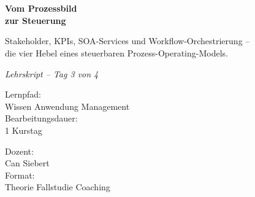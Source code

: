 \documentclass[11pt,a4paper,oneside]{article}
\newcommand{\caveatfontfallback}{\itshape}
\newcommand\caveatfont{\caveatfontfallback}%
\begin{document}
\begin{titlepage}
  \pagestyle{empty}
  \vspace*{1.5cm}
  \\[2pt]
  \noindent{\color{lpAccent}\rule{\linewidth}{1.2pt}}\\[4pt]

  \vspace{3cm}
  {\sffamily\fontsize{30}{34}\selectfont\bfseries\color{lpInk}Vom Prozessbild\\zur Steuerung\par}

  \vspace{0.7cm}
  {\sffamily\large\color{lpGray}Stakeholder, KPIs, SOA-Services und Workflow-Orchestrierung --\\die vier Hebel eines steuerbaren Prozess-Operating-Models.\par}

  \vspace{1.5cm}
  {\caveatfont\LARGE\color{lpAmber}Lehrskript -- Tag 3 von 4}\par

  \vfill

  \noindent\begin{minipage}{0.55\linewidth}
    {\sffamily\footnotesize\color{lpGray}Lernpfad:}\\
    {\sffamily\small\color{lpInk}Wissen \textrightarrow{} Anwendung \textrightarrow{} Management}\\[10pt]
    {\sffamily\footnotesize\color{lpGray}Bearbeitungsdauer:}\\
    {\sffamily\small\color{lpInk}1 Kurstag}
  \end{minipage}\hfill
  \begin{minipage}{0.4\linewidth}
    \raggedleft
    {\sffamily\footnotesize\color{lpGray}Dozent:}\\
    {\sffamily\small\color{lpInk}Can Siebert}\\[10pt]
    {\sffamily\footnotesize\color{lpGray}Format:}\\
    {\sffamily\small\color{lpInk}Theorie \textperiodcentered{} Fallstudie \textperiodcentered{} Coaching}
  \end{minipage}

  \vspace{0.5cm}
  \noindent{\color{lpAccent}\rule{\linewidth}{0.6pt}}
\end{titlepage}
\end{document}
